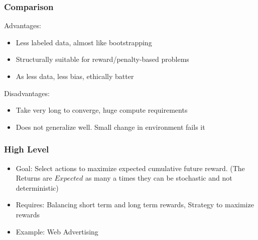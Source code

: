 \begin{frame}[fragile]\frametitle{Comparison}

Advantages:
\begin{itemize}
\item Less labeled data, almost like bootstrapping
\item Structurally suitable for reward/penalty-based problems
\item As less data, less bias, ethically batter
\end{itemize}

Disadvantages:
\begin{itemize}
\item Take very long to converge, huge compute requirements
\item Does not generalize well. Small change in environment fails it
\end{itemize}

\end{frame}


\begin{frame}[fragile]\frametitle{High Level}

\begin{itemize}
\item   Goal: Select actions to maximize expected cumulative future reward. (The Returns are $Expected$ as many a times they can be stochastic and not deterministic)
\item   Requires: Balancing short term and long term rewards, Strategy to maximize rewards
\item   Example: Web Advertising
\end{itemize}


\end{frame}



